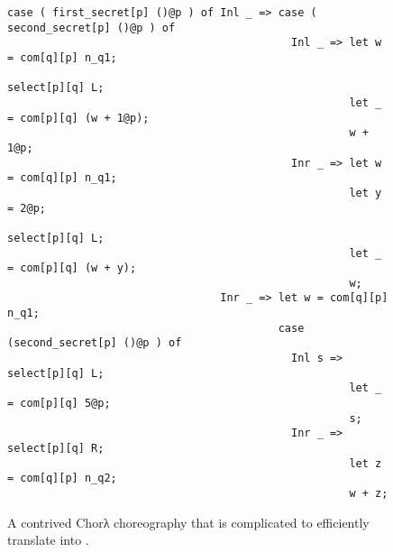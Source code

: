 \begin{figure}[tbhp]
    \begin{mdframed}
    \begin{verbatim}
case ( first_secret[p] ()@p ) of Inl _ => case ( second_secret[p] ()@p ) of
                                            Inl _ => let w = com[q][p] n_q1;
                                                     select[p][q] L;
                                                     let _ = com[p][q] (w + 1@p);
                                                     w + 1@p;
                                            Inr _ => let w = com[q][p] n_q1;
                                                     let y = 2@p;
                                                     select[p][q] L;
                                                     let _ = com[p][q] (w + y);
                                                     w;
                                 Inr _ => let w = com[q][p] n_q1;
                                          case (second_secret[p] ()@p ) of
                                            Inl s => select[p][q] L;
                                                     let _ = com[p][q] 5@p;
                                                     s;
                                            Inr _ => select[p][q] R;
                                                     let z = com[q][p] n_q2;
                                                     w + z;
    \end{verbatim}
    \caption{A contrived Chorλ choreography that is complicated to efficiently translate into \HLSCentral.}
    \label{fig:chor-lambda-complex}
    \end{mdframed}
\end{figure}

